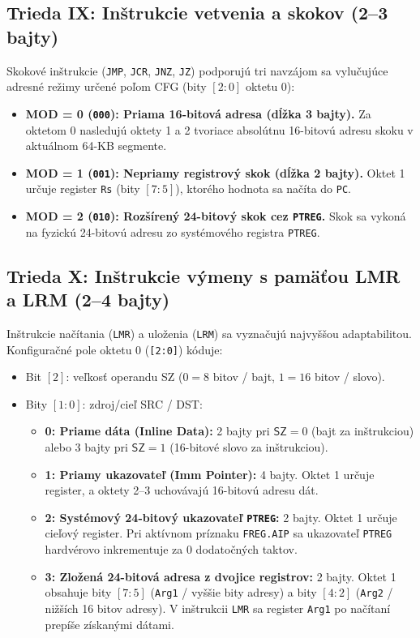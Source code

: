 \documentclass[11pt,a4paper]{article}
\newcommand{\reg}[1]{\texttt{#1}}
\newcommand{\bits}[1]{\texttt{#1}}
\newcommand{\field}[1]{\textsf{#1}}
\begin{document}
\subsection{Trieda IX: Inštrukcie vetvenia a skokov (2--3 bajty)}
Skokové inštrukcie (\texttt{JMP}, \texttt{JCR}, \texttt{JNZ}, \texttt{JZ}) podporujú tri navzájom sa vylučujúce adresné režimy určené poľom \field{CFG} (bity $[2:0]$ oktetu 0):
\begin{itemize}
  \item \textbf{MOD = 0 (\bits{000}): Priama 16-bitová adresa (dĺžka 3 bajty).} Za oktetom 0 nasledujú oktety 1 a 2 tvoriace absolútnu 16-bitovú adresu skoku v aktuálnom 64-KB segmente.
  \item \textbf{MOD = 1 (\bits{001}): Nepriamy registrový skok (dĺžka 2 bajty).} Oktet 1 určuje register \reg{Rs} (bity $[7:5]$), ktorého hodnota sa načíta do \reg{PC}.
  \item \textbf{MOD = 2 (\bits{010}): Rozšírený 24-bitový skok cez \reg{PTREG}.} Skok sa vykoná na fyzickú 24-bitovú adresu zo systémového registra \reg{PTREG}.
\end{itemize}

\subsection{Trieda X: Inštrukcie výmeny s pamäťou LMR a LRM (2--4 bajty)}
Inštrukcie načítania (\texttt{LMR}) a uloženia (\texttt{LRM}) sa vyznačujú najvyššou adaptabilitou.
Konfiguračné pole oktetu 0 (\bits{[2:0]}) kóduje:
\begin{itemize}
  \item Bit $[2]$: veľkosť operandu \field{SZ} ($0 = 8$ bitov / bajt, $1 = 16$ bitov / slovo).
  \item Bity $[1:0]$: zdroj/cieľ \field{SRC} / \field{DST}:
    \begin{itemize}
      \item \textbf{0: Priame dáta (Inline Data):} 2 bajty pri $\field{SZ}=0$ (bajt za inštrukciou) alebo 3 bajty pri $\field{SZ}=1$ (16-bitové slovo za inštrukciou).
      \item \textbf{1: Priamy ukazovateľ (Imm Pointer):} 4 bajty. Oktet 1 určuje register, a oktety 2--3 uchovávajú 16-bitovú adresu dát.
      \item \textbf{2: Systémový 24-bitový ukazovateľ \reg{PTREG}:} 2 bajty. Oktet 1 určuje cieľový register. Pri aktívnom príznaku \texttt{FREG.AIP} sa ukazovateľ \reg{PTREG} hardvérovo inkrementuje za 0 dodatočných taktov.
      \item \textbf{3: Zložená 24-bitová adresa z dvojice registrov:} 2 bajty. Oktet 1 obsahuje bity $[7:5]$ (\reg{Arg1} / vyššie bity adresy) a bity $[4:2]$ (\reg{Arg2} / nižších 16 bitov adresy). V inštrukcii \texttt{LMR} sa register \reg{Arg1} po načítaní prepíše získanými dátami.
    \end{itemize}
\end{itemize}
\end{document}
